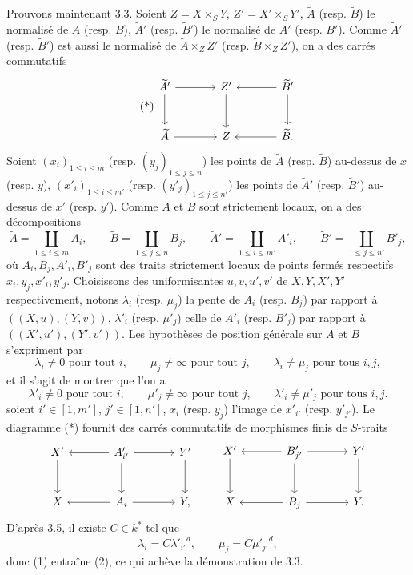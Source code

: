 \documentclass[11pt]{article}
\begin{document}
Prouvons maintenant 3.3. Soient $Z=X\times_SY$, $Z'=X'\times_SY'$, $\widetilde A$ (resp. $\widetilde B$) le normalisé de $A$ (resp. $B$), $\widetilde A'$ (resp. $\widetilde B'$) le normalisé de $A'$ (resp. $B'$). Comme $\widetilde A'$ (resp. $\widetilde B'$) est aussi le normalisé de $\widetilde A\times_ZZ'$ (resp. $\widetilde B\times_ZZ'$), on a des carrés commutatifs
\begin{equation}
\tag{*}
\begin{tikzcd}[column sep=large,row sep=large]
\widetilde A' \arrow[r] \arrow[d] & Z' \arrow[d] & \widetilde B' \arrow[l] \arrow[d]\\
\widetilde A \arrow[r] & Z & \widetilde B . \arrow[l]
\end{tikzcd}
\end{equation}
Soient $(x_i)_{1\le i\le m}$ (resp. $(y_j)_{1\le j\le n}$) les points de $\widetilde A$ (resp. $\widetilde B$) au-dessus de $x$ (resp. $y$), $(x'_i)_{1\le i\le m'}$ (resp. $(y'_j)_{1\le j\le n'}$) les points de $\widetilde A'$ (resp. $\widetilde B'$) au-dessus de $x'$ (resp. $y'$). Comme $A$ et $B$ sont strictement locaux, on a des décompositions
\[
\widetilde A=\coprod_{1\le i\le m}A_i,\qquad
\widetilde B=\coprod_{1\le j\le n}B_j,\qquad
\widetilde A'=\coprod_{1\le i\le m'}A'_i,\qquad
\widetilde B'=\coprod_{1\le j\le n'}B'_j,
\]
où $A_i,B_j,A'_i,B'_j$ sont des traits strictement locaux de points fermés respectifs $x_i,y_j,x'_i,y'_j$. Choisissons des uniformisantes $u,v,u',v'$ de $X,Y,X',Y'$ respectivement, notons $\lambda_i$ (resp. $\mu_j$) la pente de $A_i$ (resp. $B_j$) par rapport à $((X,u),(Y,v))$, $\lambda'_i$ (resp. $\mu'_j$) celle de $A'_i$ (resp. $B'_j$) par rapport à $((X',u'),(Y',v'))$. Les hypothèses de position générale sur $A$ et $B$ s'expriment par
\begin{equation}
\lambda_i\ne0\text{ pour tout }i,\qquad
\mu_j\ne\infty\text{ pour tout }j,\qquad
\lambda_i\ne\mu_j\text{ pour tous }i,j,
\tag{1}
\end{equation}
et il s'agit de montrer que l'on a
\begin{equation}
\lambda'_i\ne0\text{ pour tout }i,\qquad
\mu'_j\ne\infty\text{ pour tout }j,\qquad
\lambda'_i\ne\mu'_j\text{ pour tous }i,j.
\tag{2}
\end{equation}
soient $i'\in[1,m']$, $j'\in[1,n']$, $x_i$ (resp. $y_j$) l'image de $x'_{i'}$ (resp. $y'_{j'}$). Le diagramme (*) fournit des carrés commutatifs de morphismes finis de $S$-traits
\[
\begin{tikzcd}[column sep=large,row sep=large]
X' \arrow[d] & A'_{i'} \arrow[l] \arrow[r] \arrow[d] & Y' \arrow[d]\\
X & A_i \arrow[l] \arrow[r] & Y ,
\end{tikzcd}
\qquad
\begin{tikzcd}[column sep=large,row sep=large]
X' \arrow[d] & B'_{j'} \arrow[l] \arrow[r] \arrow[d] & Y' \arrow[d]\\
X & B_j \arrow[l] \arrow[r] & Y .
\end{tikzcd}
\]
D'après 3.5, il existe $C\in k^*$ tel que
\[
\lambda_i=C{\lambda'_{i'}}^d,\qquad
\mu_j=C{\mu'_{j'}}^d,
\]
donc (1) entraîne (2), ce qui achève la démonstration de 3.3.
\end{document}
